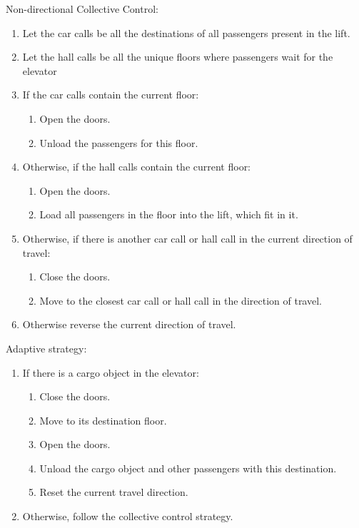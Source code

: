 Non-directional Collective Control:
\begin{enumerate}[noitemsep]
    \item Let the car calls be all the destinations of all passengers present in the lift.
    \item Let the hall calls be all the unique floors where passengers wait for the elevator
    \item If the car calls contain the current floor:
    \begin{enumerate}[noitemsep]
        \item Open the doors.
        \item Unload the passengers for this floor.
    \end{enumerate}
    \item Otherwise, if the hall calls contain the current floor:
    \begin{enumerate}[noitemsep]
        \item Open the doors.
        \item Load all passengers in the floor into the lift, which fit in it.
    \end{enumerate}
    \item Otherwise, if there is another car call or hall call in the current direction of travel:
    \begin{enumerate}[noitemsep]
        \item Close the doors.
        \item Move to the closest car call or hall call in the direction of travel.
    \end{enumerate}
    \item Otherwise reverse the current direction of travel.
\end{enumerate}

Adaptive strategy:
\begin{enumerate}[noitemsep]
    \item If there is a cargo object in the elevator:
    \begin{enumerate}[noitemsep]
        \item Close the doors.
        \item Move to its destination floor.
        \item Open the doors.
        \item Unload the cargo object and other passengers with this destination.
        \item Reset the current travel direction.
    \end{enumerate}
    \item Otherwise, follow the collective control strategy.
\end{enumerate}


